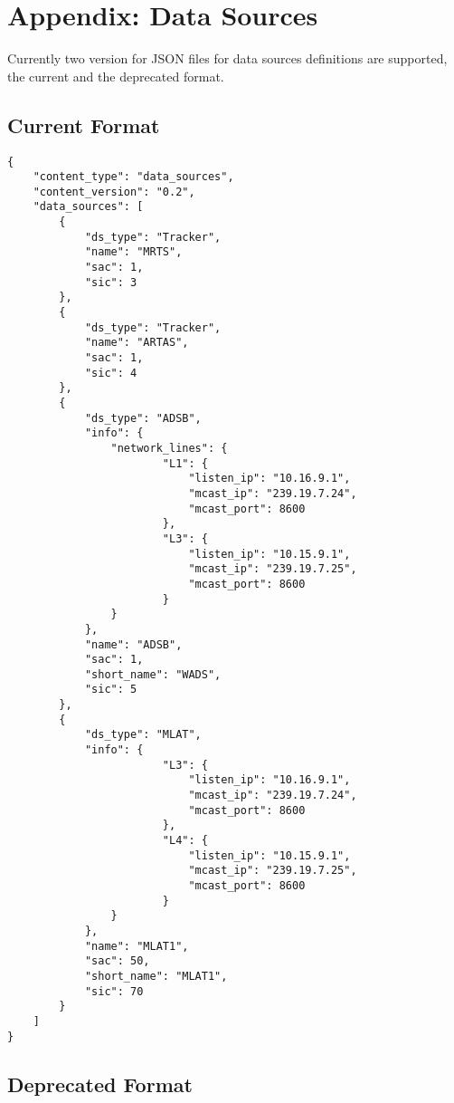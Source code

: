 \section{Appendix: Data Sources}
\label{sec:appendix_data_sources}

Currently two version for JSON files for data sources definitions are supported, the current and the deprecated format.

\subsection{Current Format}

\begin{lstlisting}
{
    "content_type": "data_sources",
    "content_version": "0.2",
    "data_sources": [
        {
            "ds_type": "Tracker",
            "name": "MRTS",
            "sac": 1,
            "sic": 3
        },
        {
            "ds_type": "Tracker",
            "name": "ARTAS",
            "sac": 1,
            "sic": 4
        },
        {
            "ds_type": "ADSB",
            "info": {
                "network_lines": {
                        "L1": {
                            "listen_ip": "10.16.9.1",
                            "mcast_ip": "239.19.7.24",
                            "mcast_port": 8600
                        },
                        "L3": {
                            "listen_ip": "10.15.9.1",
                            "mcast_ip": "239.19.7.25",
                            "mcast_port": 8600
                        }
                }
            },
            "name": "ADSB",
            "sac": 1,
            "short_name": "WADS",
            "sic": 5
        },
        {
            "ds_type": "MLAT",
            "info": {
                        "L3": {
                            "listen_ip": "10.16.9.1",
                            "mcast_ip": "239.19.7.24",
                            "mcast_port": 8600
                        },
                        "L4": {
                            "listen_ip": "10.15.9.1",
                            "mcast_ip": "239.19.7.25",
                            "mcast_port": 8600
                        }
                }
            },
            "name": "MLAT1",
            "sac": 50,
            "short_name": "MLAT1",
            "sic": 70
        }
    ]
}
\end{lstlisting}

\subsection{Deprecated Format}

